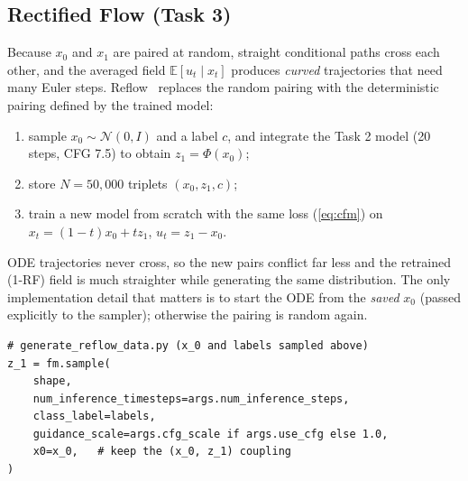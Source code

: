 \subsection{Rectified Flow (Task 3)}
\label{sec:rf}
Because $x_0$ and $x_1$ are paired at random, straight conditional paths cross each other, and the averaged field $\mathbb E[u_t\mid x_t]$ produces \emph{curved} trajectories that need many Euler steps.
Reflow~\cite{liu2023rectified} replaces the random pairing with the deterministic pairing defined by the trained model:
\begin{enumerate}
  \item sample $x_0\sim\mathcal N(0,I)$ and a label $c$, and integrate the Task 2 model (20 steps, CFG 7.5) to obtain $z_1=\Phi(x_0)$;
  \item store $N=50{,}000$ triplets $(x_0,z_1,c)$;
  \item train a new model from scratch with the same loss (\cref{eq:cfm}) on $x_t=(1-t)x_0+t z_1$, $u_t=z_1-x_0$.
\end{enumerate}
ODE trajectories never cross, so the new pairs conflict far less and the retrained (1-RF) field is much straighter while generating the same distribution.
The only implementation detail that matters is to start the ODE from the \emph{saved} $x_0$ (passed explicitly to the sampler); otherwise the pairing is random again.
\begin{lstlisting}
# generate_reflow_data.py (x_0 and labels sampled above)
z_1 = fm.sample(
    shape,
    num_inference_timesteps=args.num_inference_steps,
    class_label=labels,
    guidance_scale=args.cfg_scale if args.use_cfg else 1.0,
    x0=x_0,   # keep the (x_0, z_1) coupling
)
\end{lstlisting}

